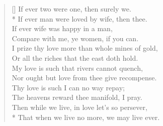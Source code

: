 \documentclass[MAIN]{subfiles}
\begin{document}
\settowidth{\versewidth}{I prize thy love more than whole mines of gold,}
\begin{verse}[\versewidth]
If ever two were one, then surely we.\\* 
If ever man were loved by wife, then thee.\\
If ever wife was happy in a man,\\
Compare with me, ye women, if you can.\\
I prize thy love more than whole mines of gold,\\
Or all the riches that the east doth hold.\\
My love is such that rivers cannot quench,\\
Nor ought but love from thee give recompense.\\
Thy love is such I can no way repay;\\
The heavens reward thee manifold, I pray.\\
Then while we live, in love let's so persever,\\*
That when we live no more, we may live ever.
\end{verse}
\end{document}
